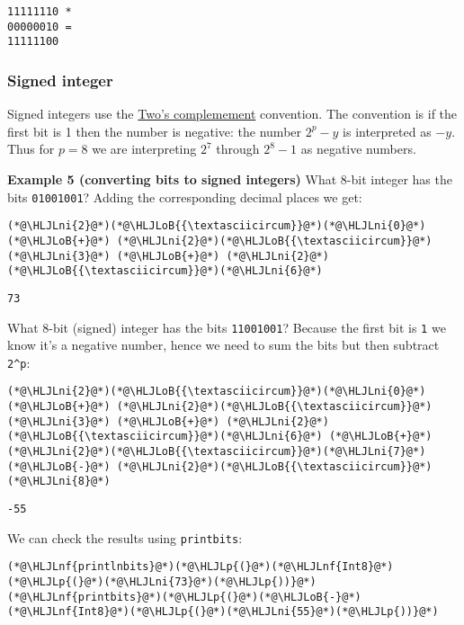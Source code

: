 \documentclass[12pt,a4paper]{article}
\newcommand{\HLJLnf}[1]{\textcolor[RGB]{66,102,213}{#1}}
\newcommand{\HLJLni}[1]{\textcolor[RGB]{59,151,46}{#1}}
\newcommand{\HLJLoB}[1]{\textcolor[RGB]{102,102,102}{\textbf{#1}}}
\newcommand{\HLJLp}[1]{#1}
\begin{document}
\begin{lstlisting}
11111110 * 
00000010 = 
11111100
\end{lstlisting}


\subsubsection{Signed integer}
Signed integers use the \href{https://epubs.siam.org/doi/abs/10.1137/1.9780898718072.ch3}{Two's complemement} convention. The convention is if the first bit is 1 then the number is negative: the number $2^p - y$ is interpreted as $-y$. Thus for $p = 8$ we are interpreting $2^7$ through $2^8-1$ as negative numbers.

\textbf{Example 5 (converting bits to signed integers)} What 8-bit integer has the bits \texttt{01001001}? Adding the corresponding decimal places we get:


\begin{lstlisting}
(*@\HLJLni{2}@*)(*@\HLJLoB{{\textasciicircum}}@*)(*@\HLJLni{0}@*) (*@\HLJLoB{+}@*) (*@\HLJLni{2}@*)(*@\HLJLoB{{\textasciicircum}}@*)(*@\HLJLni{3}@*) (*@\HLJLoB{+}@*) (*@\HLJLni{2}@*)(*@\HLJLoB{{\textasciicircum}}@*)(*@\HLJLni{6}@*)
\end{lstlisting}

\begin{lstlisting}
73
\end{lstlisting}


What 8-bit (signed) integer has the bits \texttt{11001001}? Because the first bit is \texttt{1} we know it's a negative number, hence we need to sum the bits but then subtract \texttt{2\^{}p}:


\begin{lstlisting}
(*@\HLJLni{2}@*)(*@\HLJLoB{{\textasciicircum}}@*)(*@\HLJLni{0}@*) (*@\HLJLoB{+}@*) (*@\HLJLni{2}@*)(*@\HLJLoB{{\textasciicircum}}@*)(*@\HLJLni{3}@*) (*@\HLJLoB{+}@*) (*@\HLJLni{2}@*)(*@\HLJLoB{{\textasciicircum}}@*)(*@\HLJLni{6}@*) (*@\HLJLoB{+}@*) (*@\HLJLni{2}@*)(*@\HLJLoB{{\textasciicircum}}@*)(*@\HLJLni{7}@*) (*@\HLJLoB{-}@*) (*@\HLJLni{2}@*)(*@\HLJLoB{{\textasciicircum}}@*)(*@\HLJLni{8}@*)
\end{lstlisting}

\begin{lstlisting}
-55
\end{lstlisting}


We can check the results using \texttt{printbits}:


\begin{lstlisting}
(*@\HLJLnf{printlnbits}@*)(*@\HLJLp{(}@*)(*@\HLJLnf{Int8}@*)(*@\HLJLp{(}@*)(*@\HLJLni{73}@*)(*@\HLJLp{))}@*)
(*@\HLJLnf{printbits}@*)(*@\HLJLp{(}@*)(*@\HLJLoB{-}@*)(*@\HLJLnf{Int8}@*)(*@\HLJLp{(}@*)(*@\HLJLni{55}@*)(*@\HLJLp{))}@*)
\end{lstlisting}
\end{document}
